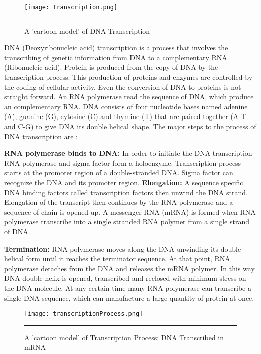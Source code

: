 \begin{figure}%
	\centering
		 \texttt{[image: Transcription.png]} 
		\rule{35em}{0.5pt}
	\caption{A 'cartoon model' of DNA Transcription}
	\label{fig:transcription}
\end{figure}

DNA (Deoxyribonucleic acid) transcription is a process that involves the transcribing of genetic information from DNA to a complementary RNA (Ribonucleic acid). Protein is produced from the copy of DNA by the transcription process. This production of proteins and enzymes are controlled by the coding of cellular activity. Even the conversion of DNA to proteins is not straight forward. An RNA polymerase read the sequence of DNA, which produce an complementary RNA. DNA consists of four nucleotide bases named adenine (A), guanine (G), cytosine (C) and thymine (T) that are paired together (A-T and C-G) to give DNA its double helical shape. The major steps to the process of DNA transcription are :

\textbf{RNA polymerase binds to DNA:} In order to initiate the DNA transcription RNA polymerase and sigma factor form a holoenzyme. Transcription process starts at the promoter region of a double-stranded DNA. Sigma factor can recognize the DNA and its promoter region. \textbf{Elongation:} A sequence specific DNA binding factors called transcription factors then unwind the DNA strand. Elongation of the transcript then continues by the RNA polymerase and a sequence of chain is opened up. A messenger RNA (mRNA) is formed when RNA polymerase transcribe into a single stranded RNA polymer from a single strand of DNA.

\textbf{Termination:} RNA polymerase moves along the DNA unwinding its double helical form until it reaches the terminator sequence. At that point, RNA polymerase detaches from the DNA and releases the mRNA polymer. In this way DNA double helix is opened, transcribed and reclosed with minimum stress on the DNA molecule. At any certain time many RNA polymerase can transcribe a single DNA sequence, which can manufacture a large quantity of protein at once. 

\begin{figure}%
	\centering
		\texttt{[image: transcriptionProcess.png]}
		\rule{35em}{0.5pt}
	\caption{A 'cartoon model' of Transcription Process: DNA Transcribed in mRNA}
	\label{fig:transcriptionProcess}
\end{figure}

